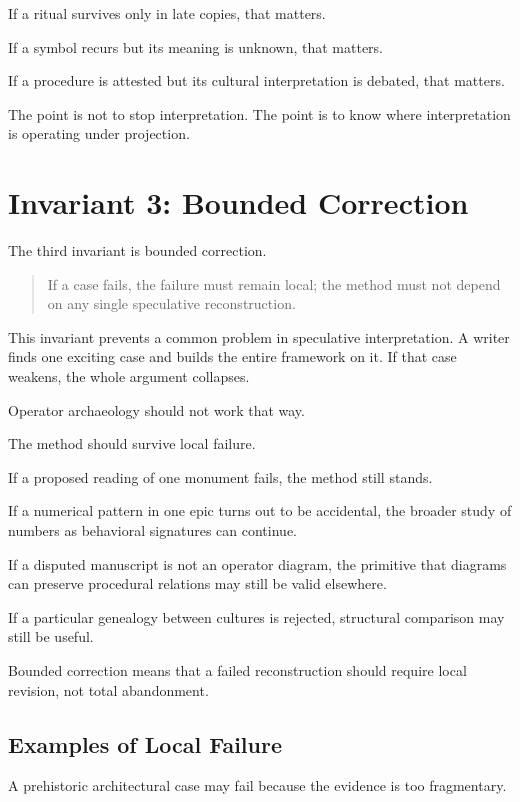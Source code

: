 \documentclass[11pt]{book}
\begin{document}
If a ritual survives only in late copies, that matters.

If a symbol recurs but its meaning is unknown, that matters.

If a procedure is attested but its cultural interpretation is debated, that matters.

The point is not to stop interpretation. The point is to know where interpretation is operating under projection.

\section{Invariant 3: Bounded Correction}

The third invariant is bounded correction.

\begin{quote}
If a case fails, the failure must remain local; the method must not depend on any single speculative reconstruction.
\end{quote}

This invariant prevents a common problem in speculative interpretation. A writer finds one exciting case and builds the entire framework on it. If that case weakens, the whole argument collapses.

Operator archaeology should not work that way.

The method should survive local failure.

If a proposed reading of one monument fails, the method still stands.

If a numerical pattern in one epic turns out to be accidental, the broader study of numbers as behavioral signatures can continue.

If a disputed manuscript is not an operator diagram, the primitive that diagrams can preserve procedural relations may still be valid elsewhere.

If a particular genealogy between cultures is rejected, structural comparison may still be useful.

Bounded correction means that a failed reconstruction should require local revision, not total abandonment.

\subsection{Examples of Local Failure}

A prehistoric architectural case may fail because the evidence is too fragmentary.
\end{document}
